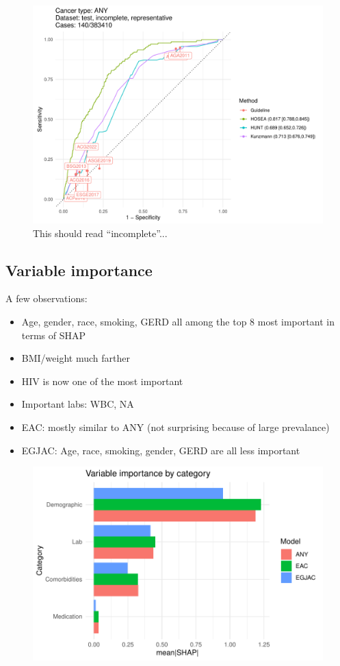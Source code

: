 \documentclass[12pt]{article}
\begin{document}
\begin{figure}[ht]
\includegraphics[width=1.0\linewidth]{comparison/ANY_incomplete_representative.pdf}
\caption{This should read ``incomplete''...}
\end{figure}

\newpage
\clearpage
\subsection{Variable importance}

A few observations:
\begin{itemize}
\item Age, gender, race, smoking, GERD all among the top 8 most important in terms of SHAP
\item BMI/weight much farther
\item HIV is now one of the most important
\item Important labs: WBC, NA
\item EAC: mostly similar to ANY (not surprising because of large prevalance)
\item EGJAC: Age, race, smoking, gender, GERD are all less important
\end{itemize}


\begin{figure}[ht]
\includegraphics[width=1.0\linewidth]{variable_importance/shap_cat.pdf}
\end{figure}
\end{document}
